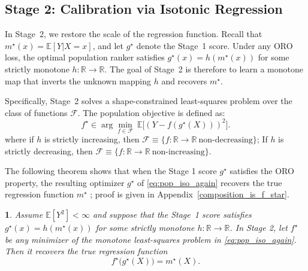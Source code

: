\documentclass[11pt]{article}
\theoremstyle{plain}
\theoremstyle{plain}
\theoremstyle{plain}
\theoremstyle{plain}
\newtheorem{theorem}{\protect\theoremname}
\theoremstyle{plain}
\theoremstyle{plain}
\theoremstyle{plain}
\newenvironment{addedblock}{\begingroup\color{cairoaddedgreen}}{\endgroup}
\providecommand{\theoremname}{Theorem}
\begin{document}
\begin{addedblock}

\end{addedblock}


\subsection{Stage 2: Calibration via Isotonic Regression}
\label{sec:calibration}

In Stage~2, we restore the scale of the regression function.  
Recall that $m^\star(x)=\mathbb{E}[Y|X=x]$, and let $g^\star$ denote the Stage~1 score.  
Under any ORO loss, the optimal population ranker satisfies $g^\star(x) = h( m^\star(x))$ for some strictly monotone $h:\mathbb R\to\mathbb R.$ The goal of Stage~2 is therefore to learn a monotone map that inverts the unknown mapping $h$ and recovers $m^\star$.


Specifically, Stage~2 solves a shape-constrained least-squares problem over the class of functions $\mathcal{F}$. The population objective is defined as:
\begin{equation}
\label{eq:pop_iso_again}
f^\star \in \arg\min_{f\in\mathcal F} \ \mathbb{E}\big[(Y - f(g^\star(X)))^2\big].
\end{equation}
where if $h$ is strictly increasing, then  $\mathcal F \equiv \{ f : \mathbb{R} \to \mathbb{R} \ \text{non-decreasing} \}$; If $h$ is strictly decreasing, then  $\mathcal F \equiv \{ f : \mathbb{R} \to \mathbb{R} \ \text{non-increasing}\}$.

The following theorem shows that when the Stage 1 score $g^\star$ satisfies the ORO property, the resulting optimizer $g^\star$ of \eqref{eq:pop_iso_again} recovers the true regression function $m^\star$ ; proof is given in Appendix~\ref{composition_is_f_star}.

\begin{theorem}
\label{composition_is_f_star_statement}
Assume $\mathbb{E}[Y^2] < \infty$ and suppose that the Stage~1 score satisfies $g^{\star}(x) = h(m^\star(x))$ for some strictly monotone $h:\mathbb R\to\mathbb R$. In Stage 2, let $f^{\star}$ be any minimizer of the monotone least-squares problem in \eqref{eq:pop_iso_again}.  
Then it recovers the true regression function
\[
f^{\star}\big(g^{\star}(X)\big) = m^\star(X) .
\]
\end{theorem}
\end{document}
